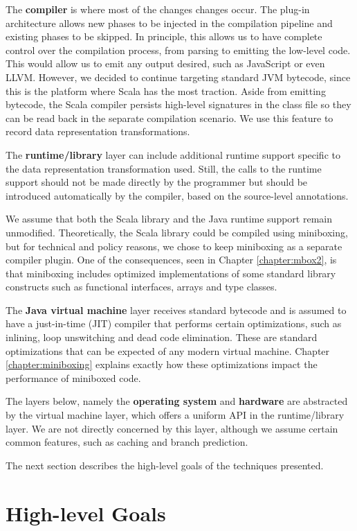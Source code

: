 The \textbf{compiler} is where most of the changes changes occur. The plug-in architecture allows new phases to be injected in the compilation pipeline and existing phases to be skipped. In principle, this allows us to have complete control over the compilation process, from parsing to emitting the low-level code. This would allow us to emit any output desired, such as JavaScript \cite{scala-js} or even LLVM. However, we decided to continue targeting standard JVM bytecode, since this is the platform where Scala has the most traction. Aside from emitting bytecode, the Scala compiler persists high-level signatures in the class file so they can be read back in the separate compilation scenario. We use this feature to record data representation transformations.

The \textbf{runtime/library} layer can include additional runtime support specific to the data representation transformation used. Still, the calls to the runtime support should not be made directly by the programmer but should be introduced automatically by the compiler, based on the source-level annotations.

We assume that both the Scala library and the Java runtime support remain unmodified. Theoretically, the Scala library could be compiled using miniboxing, but for technical and policy reasons, we chose to keep miniboxing as a separate compiler plugin. One of the consequences, seen in Chapter \ref{chapter:mbox2}, is that miniboxing includes optimized implementations of some standard library constructs such as functional interfaces, arrays and type classes.

The \textbf{Java virtual machine} layer receives standard bytecode and is assumed to have a just-in-time (JIT) compiler that performs certain optimizations, such as inlining, loop unswitching and dead code elimination. These are standard optimizations that can be expected of any modern virtual machine. Chapter \ref{chapter:miniboxing} explains exactly how these optimizations impact the performance of miniboxed code.

The layers below, namely the \textbf{operating system} and \textbf{hardware} are abstracted by the virtual machine layer, which offers a uniform API in the runtime/library layer. We are not directly concerned by this layer, although we assume certain common features, such as caching and branch prediction.

The next section describes the high-level goals of the techniques presented.

\section{High-level Goals}

